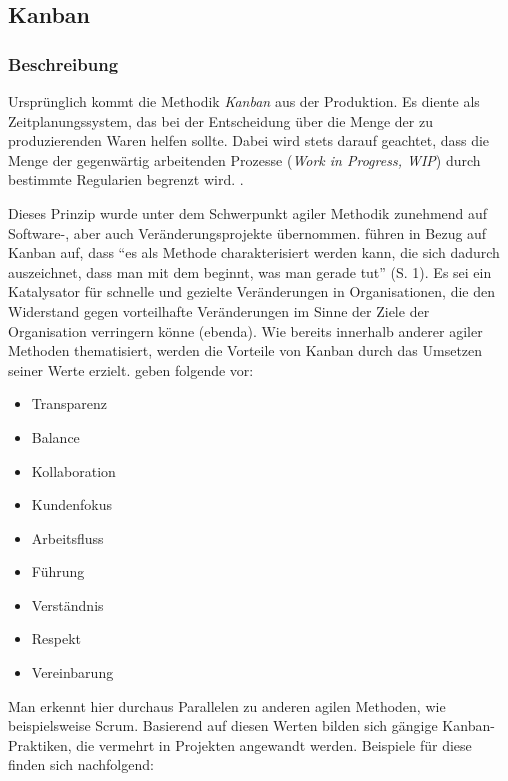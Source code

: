 \subsection{Kanban}

\subsubsection{Beschreibung}

Ursprünglich kommt die Methodik \textit{Kanban} aus der Produktion.  Es diente als Zeitplanungssystem, das bei der Entscheidung über die Menge der zu produzierenden Waren helfen sollte. Dabei wird stets darauf geachtet, dass die Menge der gegenwärtig arbeitenden Prozesse (\textit{Work in Progress, WIP}) durch bestimmte Regularien begrenzt wird. \cite[S. 12f.]{leopold_kanban_2018}.

Dieses Prinzip wurde unter dem Schwerpunkt agiler Methodik zunehmend auf Software-, aber auch Veränderungsprojekte übernommen.  führen in Bezug auf Kanban auf, dass ``es als Methode charakterisiert werden kann, die sich dadurch auszeichnet, dass man mit dem beginnt, was man gerade tut'' (S. 1). Es sei ein Katalysator für schnelle und gezielte
Veränderungen in Organisationen, die den Widerstand gegen vorteilhafte Veränderungen im Sinne der Ziele der Organisation verringern könne (ebenda). Wie bereits innerhalb anderer agiler Methoden thematisiert, werden die Vorteile von Kanban durch das Umsetzen seiner Werte erzielt.  geben folgende vor:

\begin{itemize}[noitemsep, topsep=0pt]
	\item Transparenz
	\item Balance
	\item Kollaboration
	\item Kundenfokus
	\item Arbeitsfluss
	\item Führung
	\item Verständnis
	\item Respekt
	\item Vereinbarung
\end{itemize}

Man erkennt hier durchaus Parallelen zu anderen agilen Methoden, wie beispielsweise Scrum. Basierend auf diesen Werten bilden sich gängige Kanban-Praktiken, die vermehrt in Projekten angewandt werden. Beispiele für diese finden sich nachfolgend:

